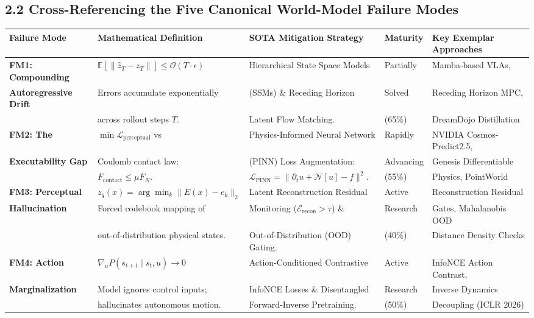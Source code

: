 \documentclass[11pt,a4paper]{article}
\begin{document}
\subsection{2.2 Cross-Referencing the Five Canonical World-Model Failure Modes}
\begin{table}[h!]
\centering
\scriptsize
\begin{tabularx}{\textwidth}{@{}l p{3.8cm} p{4.2cm} l X@{}}
\toprule
\textbf{Failure Mode} & \textbf{Mathematical Definition} & \textbf{SOTA Mitigation Strategy} & \textbf{Maturity} & \textbf{Key Exemplar Approaches} \\
\midrule
\textbf{FM1: Compounding} & $\mathbb{E}[\|\hat{z}_T - z_T\|] \le \mathcal{O}(T \cdot \epsilon)$ & Hierarchical State Space Models & Partially & Mamba-based VLAs, \\
\textbf{Autoregressive Drift} & Errors accumulate exponentially & (SSMs) \& Receding Horizon & Solved & Receding Horizon MPC, \\
& across rollout steps $T$. & Latent Flow Matching. & (65\%) & DreamDojo Distillation \\
\addlinespace
\textbf{FM2: The} & $\min \mathcal{L}_{\text{perceptual}}$ vs & Physics-Informed Neural Network & Rapidly & NVIDIA Cosmos-Predict2.5, \\
\textbf{Executability Gap} & Coulomb contact law: & (PINN) Loss Augmentation: & Advancing & Genesis Differentiable \\
& $F_{\text{contact}} \le \mu F_N$. & $\mathcal{L}_{\text{PINN}} = \|\partial_t u + \mathcal{N}[u] - f\|^2$. & (55\%) & Physics, PointWorld \\
\addlinespace
\textbf{FM3: Perceptual} & $z_q(x) = \arg\min_k \|E(x) - e_k\|_2$ & Latent Reconstruction Residual & Active & Reconstruction Residual \\
\textbf{Hallucination} & Forced codebook mapping of & Monitoring ($\mathcal{E}_{\text{recon}} > \tau$) \& & Research & Gates, Mahalanobis OOD \\
& out-of-distribution physical states. & Out-of-Distribution (OOD) Gating. & (40\%) & Distance Density Checks \\
\addlinespace
\textbf{FM4: Action} & $\nabla_u P(s_{t+1} \mid s_t, u) \to 0$ & Action-Conditioned Contrastive & Active & InfoNCE Action Contrast, \\
\textbf{Marginalization} & Model ignores control inputs; & InfoNCE Losses \& Disentangled & Research & Inverse Dynamics \\
& hallucinates autonomous motion. & Forward-Inverse Pretraining. & (50\%) & Decoupling (ICLR 2026) \\

\end{tabularx}
\end{table}
\end{document}
